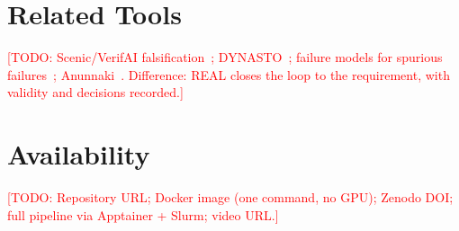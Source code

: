 \documentclass[10pt,conference]{IEEEtran}
\newcommand{\todo}[1]{\textcolor{red}{[TODO: #1]}}
\begin{document}
\section{Related Tools}
\todo{Scenic/VerifAI falsification~\cite{viswanadha2021}; DYNASTO~\cite{dynasto2026};
failure models for spurious failures~\cite{jodat2024}; Anunnaki~\cite{anunnaki2024}.
Difference: REAL closes the loop to the requirement, with validity and
decisions recorded.}

\section{Availability}
\todo{Repository URL; Docker image (one command, no GPU); Zenodo DOI;
full pipeline via Apptainer + Slurm; video URL.}



\end{document}
